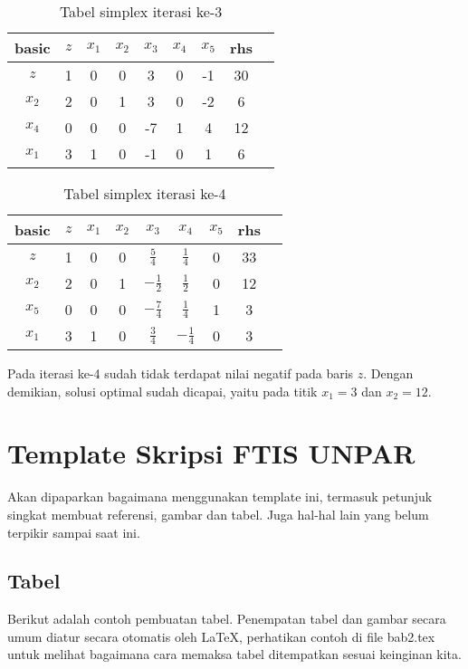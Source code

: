 \begin{enumerate}
		\begin{table}[H]
			\centering
			\begin{tabular}{|c|c|c c c c c|c|c}
				\hline
			 	basic & $z$ & $x_1$ & $x_2$ & $x_3$ & $x_4$ & $x_5$ & rhs \\
				\hline
				$z$ & 1 & 0 & 0 & 3 & 0 & -1 & 30 \\
				\hline
				$x_2$ & 2 & 0 & 1 & 3 & 0 & -2 & 6 \\
				$x_4$ & 0 & 0 & 0 & -7 & 1 & 4 & 12 \\
				$x_1$ & 3 & 1 & 0 & -1 & 0 & 1 & 6 \\
				\hline
			\end{tabular}
			\caption{Tabel simplex iterasi ke-3}
		\end{table}

		\begin{table}[H]
			\centering
			\begin{tabular}{|c|c|c c c c c|c|c}
				\hline
			 	basic & $z$ & $x_1$ & $x_2$ & $x_3$ & $x_4$ & $x_5$ & rhs \\
				\hline
				$z$ & 1 & 0 & 0 & $\frac{5}{4}$ & $\frac{1}{4}$ & 0 & 33 \\
				\hline
				$x_2$ & 2 & 0 & 1 & $-\frac{1}{2}$ & $\frac{1}{2}$ & 0 & 12 \\
				$x_5$ & 0 & 0 & 0 & $-\frac{7}{4}$& $\frac{1}{4}$ & 1 & 3 \\
				$x_1$ & 3 & 1 & 0 & $\frac{3}{4}$ & $-\frac{1}{4}$ & 0 & 3 \\
				\hline
			\end{tabular}
			\caption{Tabel simplex iterasi ke-4}
		\end{table}

		Pada iterasi ke-4 sudah tidak terdapat nilai negatif pada baris $z$. Dengan demikian, solusi optimal sudah dicapai, yaitu pada titik $x_1 = 3$ dan $x_2=12$.

\end{enumerate}

\section{Template Skripsi FTIS UNPAR}
\label{sec:template}
 
Akan dipaparkan bagaimana menggunakan template ini, termasuk petunjuk singkat membuat referensi, gambar dan tabel.
Juga hal-hal lain yang belum terpikir sampai saat ini. 
 

\subsection{Tabel}  
Berikut adalah contoh pembuatan tabel. 
Penempatan tabel dan gambar secara umum diatur secara otomatis oleh \LaTeX{}, perhatikan contoh di file bab2.tex untuk melihat bagaimana cara memaksa tabel ditempatkan sesuai keinginan kita.

